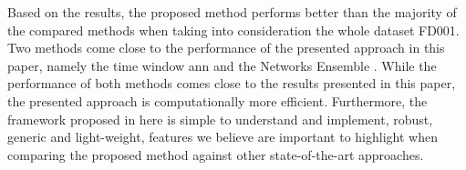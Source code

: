 Based on the results, the proposed method performs better than the majority of the compared methods when taking into consideration the whole dataset FD001. Two methods come close to the performance of the presented approach in this paper, namely the time window \gls{ann} \citep{Lim2016} and the Networks Ensemble \citep{Zhang2016}. While the performance of both methods comes close to the results presented in this paper, the presented approach is computationally more efficient. Furthermore, the framework proposed in here is simple to understand and implement, robust, generic and light-weight, features we believe are important to highlight when comparing the proposed method against other state-of-the-art approaches.

